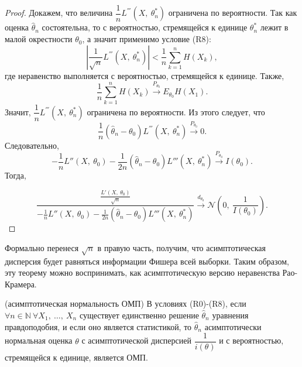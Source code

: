 \begin{proof}
    Докажем, что величина $\displaystyle \dfrac{1}{n} L^{'''}\left( X,\ \theta _{n}^{*}\right)$ ограничена по вероятности. Так как оценка $\displaystyle \hat{\theta }_{n}$ состоятельна, то с вероятностью, стремящейся к единице $\displaystyle \theta _{n}^{*}$ лежит в малой окрестности $\displaystyle \theta _{0}$, а значит применимо условие (R8):
    \begin{equation*}
        \left| \dfrac{1}{\sqrt{n}} L^{'''}\left( X,\ \theta _{n}^{*}\right)\right| < \dfrac{1}{n}\sum _{k=1}^{n} H( X_{k}) ,
    \end{equation*}
    где неравенство выполняется с вероятностью, стремящейся к единице. Также,
    \begin{equation*}
        \dfrac{1}{n}\sum _{k=1}^{n} H( X_{k})\xrightarrow{P_{\theta _{0}}} E_{\theta _{0}} H( X_{1}) .
    \end{equation*}
    Значит, $\displaystyle \dfrac{1}{n} L^{'''}\left( X,\ \theta _{n}^{*}\right)$ ограничена по вероятности. Из этого следует, что
    \begin{equation*}
        \frac{1}{n}(\hat{\theta }_{n} -\theta _{0}) L^{'''}\left( X,\ \theta _{n}^{*}\right)\xrightarrow{P_{\theta _{0}}} 0.
    \end{equation*}
    Следовательно,
    \begin{equation*}
        -\frac{1}{n} L''( X,\ \theta _{0}) -\frac{1}{2n}(\hat{\theta }_{n} -\theta _{0}) L'''\left( X,\ \theta _{n}^{*}\right)\xrightarrow{P_{\theta _{0}}} I( \theta _{0}) .
    \end{equation*}
    Тогда,
    
    
    \begin{equation*}
        \dfrac{\frac{L'( X,\ \theta _{0})}{\sqrt{n}}}{-\frac{1}{n} L''( X,\ \theta _{0}) -\frac{1}{2n}(\hat{\theta }_{n} -\theta _{0}) L'''\left( X,\ \theta _{n}^{*}\right)}\xrightarrow{d_{\theta _{0}}}\mathcal{N}\left( 0,\ \dfrac{1}{I( \theta _{0})}\right) .
    \end{equation*}
\end{proof}
\begin{note}
    Формально перенеся $\displaystyle \sqrt{n}$ в правую часть, получим, что асимптотическая дисперсия будет равняться информации Фишера всей выборки. Таким образом, эту теорему можно воспринимать, как асимптотическую версию неравенства Рао-Крамера.
\end{note}
\begin{corollary}
    (асимптотическая нормальность ОМП) В условиях (R0)-(R8), если $\displaystyle \forall n\in \mathbb{N} \ \forall X_{1} ,\ \dotsc ,\ X_{n}$ существует единственно решение $\displaystyle \hat{\theta }_{n}$ уравнения правдоподобия, и если оно является статистикой, то $\displaystyle \hat{\theta }_{n}$ асимптотически нормальная оценка $\displaystyle \theta $ с асимптотической дисперсией $\displaystyle \dfrac{1}{i( \theta )}$ и с вероятностью, стремящейся к единице, является ОМП. 
\end{corollary}
